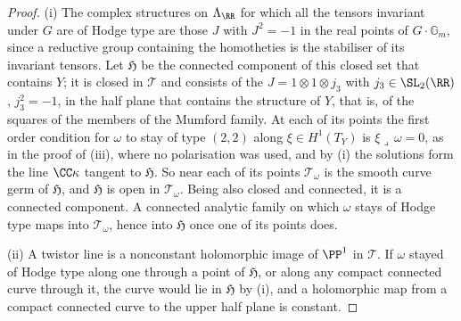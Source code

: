\begin{proof}
(i) The complex structures on $\Lambda_{\RR}$ for which all the tensors
invariant under $G$ are of Hodge type are those $J$ with $J^{2}=-1$ in the
real points of $G\cdot\mathbb{G}_{m}$, since a reductive group containing the
homotheties is the stabiliser of its invariant tensors. Let $\mathfrak{H}$ be
the connected component of this closed set that contains $Y$; it is closed in
$\mathcal{T}$ and consists of the $J=1\otimes1\otimes j_{3}$ with
$j_{3}\in\SL_{2}(\RR)$, $j_{3}^{2}=-1$, in the half plane that contains the
structure of $Y$, that is, of the squares of the members of the Mumford
family. At each of its points the first order condition for $\omega$ to stay
of type $(2,2)$ along $\xi\in H^{1}(T_{Y})$ is $\xi\lrcorner\,\omega=0$, as
in the proof of
(iii), where no polarisation was used, and by
(i) the solutions form the line $\CC\kappa$ tangent to
$\mathfrak{H}$. So near each of its points $\mathcal{T}_{\omega}$ is the smooth
curve germ of $\mathfrak{H}$, and $\mathfrak{H}$ is open in
$\mathcal{T}_{\omega}$. Being also closed and connected, it is a connected
component. A connected analytic family on which $\omega$ stays of Hodge type
maps into $\mathcal{T}_{\omega}$, hence into $\mathfrak{H}$ once one of its
points does.

(ii) A twistor line is a nonconstant holomorphic image of $\PP^{1}$ in
$\mathcal{T}$. If $\omega$ stayed of Hodge type along one through a point of
$\mathfrak{H}$, or along any compact connected curve through it, the curve
would lie in $\mathfrak{H}$ by (i), and a holomorphic map from a compact
connected curve to the upper half plane is constant.


\end{proof}
